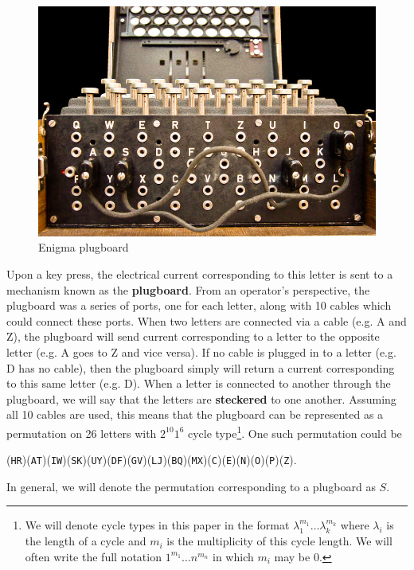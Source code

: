 \begin{figure}[htbp]
  \begin{center}\includegraphics[scale=1.2]{paper/images/plugboard.jpg}
  \end{center}
  \label{ref:plugboard}
  \caption{Enigma plugboard}
\end{figure}
\noindent Upon a key press, the electrical current corresponding to this letter
is sent to a mechanism known as the {\bf{plugboard}}. From an operator's
perspective, the plugboard was a series of ports, one for each
letter, along with 10 cables which could connect these ports. When
two letters are connected via a cable (e.g. A and Z), the plugboard
will send current corresponding to a letter to the opposite letter
(e.g. A goes to Z and vice versa). If no cable is plugged in to a
letter (e.g. D has no cable), then the plugboard simply will return a
current corresponding to this same letter (e.g. D). When a letter is
connected to another
through the plugboard, we will say that the letters are
{\bf{steckered}} to one another. Assuming all 10
cables are used, this means that the plugboard can be represented as a
permutation on 26 letters with $2^{10}1^6$ cycle type\footnote{We
  will denote cycle types in this paper in the format
  $\lambda_1^{m_1}\dots\lambda_k^{m_k}$ where $\lambda_i$ is the length
  of a cycle and $m_i$ is the multiplicity of this cycle length. We
  will often write the full notation $1^{m_1}\dots n^{m_n}$ in which
$m_i$ may be $0$.}. One such
permutation could be
\begin{center}
  (\texttt{HR})(\texttt{AT})(\texttt{IW})(\texttt{SK})(\texttt{UY})(\texttt{DF})(\texttt{GV})(\texttt{LJ})(\texttt{BQ})(\texttt{MX})(\texttt{C})(\texttt{E})(\texttt{N})(\texttt{O})(\texttt{P})(\texttt{Z}).
\end{center}
In general, we will denote the permutation corresponding to a plugboard as $S$.

